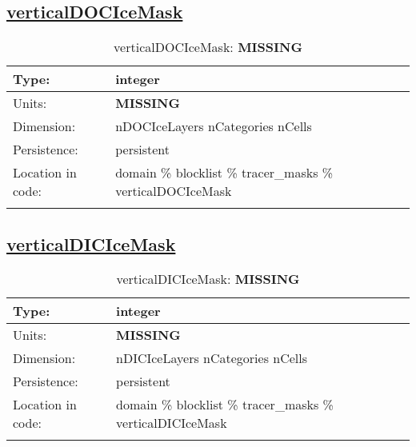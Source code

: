 \subsection[verticalDOCIceMask]{\hyperref[sec:var_tab_tracer_masks]{verticalDOCIceMask}}
\label{subsec:var_sec_tracer_masks_verticalDOCIceMask}
\begin{center}
\begin{longtable}{| p{2.0in} | p{4.0in} |}
        \hline 
        Type: & integer \\
        \hline 
        Units: & {\bf \color{red} MISSING} \\
        \hline 
        Dimension: & nDOCIceLayers nCategories nCells \\
        \hline 
        Persistence: & persistent \\
        \hline 
         Location in code: & domain \% blocklist \% tracer\_masks \% verticalDOCIceMask \\
         \hline 
    \caption{verticalDOCIceMask: {\bf \color{red} MISSING}}
\end{longtable}
\end{center}
\subsection[verticalDICIceMask]{\hyperref[sec:var_tab_tracer_masks]{verticalDICIceMask}}
\label{subsec:var_sec_tracer_masks_verticalDICIceMask}
\begin{center}
\begin{longtable}{| p{2.0in} | p{4.0in} |}
        \hline 
        Type: & integer \\
        \hline 
        Units: & {\bf \color{red} MISSING} \\
        \hline 
        Dimension: & nDICIceLayers nCategories nCells \\
        \hline 
        Persistence: & persistent \\
        \hline 
         Location in code: & domain \% blocklist \% tracer\_masks \% verticalDICIceMask \\
         \hline 
    \caption{verticalDICIceMask: {\bf \color{red} MISSING}}
\end{longtable}
\end{center}

